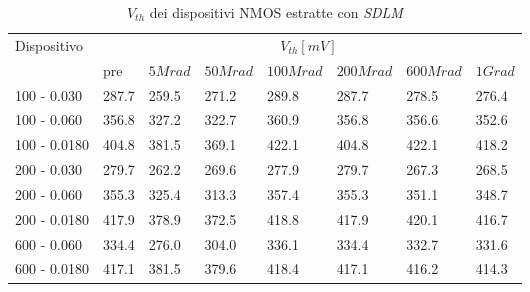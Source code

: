 \documentclass[
	a4paper,
	cleardoublepage=empty,
	headings=twolinechapter,
	numbers=autoenddot,
]{scrbook}
\begin{document}
\begin{table}[H]
  \renewcommand{\arraystretch}{1.3}
  \begin{tabular}{m{2.1cm} m{0.8cm} m{1.1cm} m{1.3cm} m{1.5cm} m{1.5cm} m{1.5cm} m{1cm}}
    \toprule
    \multirow{2}{*}{Dispositivo} & \multicolumn{7}{c}{$V_{th} [mV] $}                                                                    \\
    \cmidrule{2-8}
                                 & pre                                & $5Mrad$ & $50Mrad$ & $100Mrad$ & $200Mrad$ & $600Mrad$ & $1Grad$ \\
    \midrule
    100 - 0.030                     & 287.7                              & 259.5   & 271.2    & 289.8     & 287.7     & 278.5     & 276.4        \\
    \hline
    100 - 0.060                     & 356.8                              & 327.2   & 322.7    & 360.9     & 356.8     & 356.6     & 352.6        \\
    \hline
    100 - 0.0180                    & 404.8                              & 381.5   & 369.1    & 422.1     & 404.8     & 422.1     & 418.2        \\
    \hline
    200 - 0.030                     & 279.7                              & 262.2   & 269.6    & 277.9     & 279.7     & 267.3     & 268.5         \\
    \hline
    200 - 0.060                     & 355.3                              & 325.4   & 313.3    & 357.4     & 355.3     & 351.1     & 348.7       \\
    \hline
    200 - 0.0180                    & 417.9                              & 378.9   & 372.5    & 418.8     & 417.9     & 420.1     & 416.7        \\
    \hline
    600 - 0.060                     & 334.4                              & 276.0   & 304.0    & 336.1     & 334.4     & 332.7     & 331.6        \\
    \hline
    600 - 0.0180                    & 417.1                              & 381.5   & 379.6    & 418.4     & 417.1     & 416.2     & 414.3        \\
    \bottomrule
  \end{tabular}
  \caption{$V_{th}$ dei dispositivi NMOS estratte con \emph{SDLM}}
  \label{tab:VthSDLMN}
\end{table}
\end{document}
